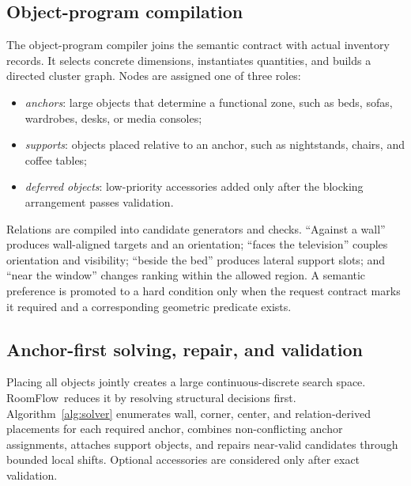 \documentclass[pdflatex,sn-mathphys-num]{sn-jnl}
\newcommand{\method}{RoomFlow}
\begin{document}
\subsection{Object-program compilation}

The object-program compiler joins the semantic contract with actual inventory records. It selects concrete dimensions, instantiates quantities, and builds a directed cluster graph. Nodes are assigned one of three roles:

\begin{itemize}
  \item \emph{anchors}: large objects that determine a functional zone, such as beds, sofas, wardrobes, desks, or media consoles;
  \item \emph{supports}: objects placed relative to an anchor, such as nightstands, chairs, and coffee tables;
  \item \emph{deferred objects}: low-priority accessories added only after the blocking arrangement passes validation.
\end{itemize}

Relations are compiled into candidate generators and checks. ``Against a wall'' produces wall-aligned targets and an orientation; ``faces the television'' couples orientation and visibility; ``beside the bed'' produces lateral support slots; and ``near the window'' changes ranking within the allowed region. A semantic preference is promoted to a hard condition only when the request contract marks it required and a corresponding geometric predicate exists.

\subsection{Anchor-first solving, repair, and validation}

Placing all objects jointly creates a large continuous-discrete search space. \method\ reduces it by resolving structural decisions first. Algorithm~\ref{alg:solver} enumerates wall, corner, center, and relation-derived placements for each required anchor, combines non-conflicting anchor assignments, attaches support objects, and repairs near-valid candidates through bounded local shifts. Optional accessories are considered only after exact validation.
\end{document}
